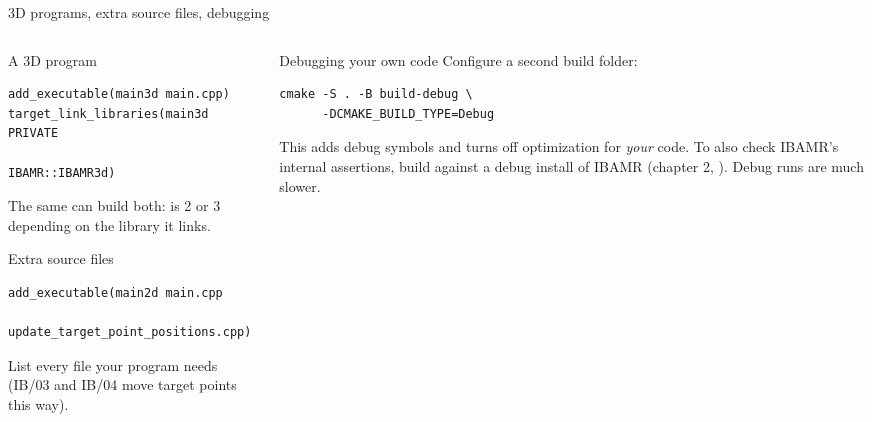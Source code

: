 \documentclass[aspectratio=169,11pt]{beamer}
\begin{document}
\begin{frame}[fragile]{3D programs, extra source files, debugging}
\begin{columns}[T,onlytextwidth]
\begin{column}{0.49\textwidth}
\begin{block}{A 3D program}
\begin{lstlisting}[style=shell]
add_executable(main3d main.cpp)
target_link_libraries(main3d PRIVATE
                      IBAMR::IBAMR3d)
\end{lstlisting}
\small The same  can build both:  is 2 or 3 depending on the library it links.
\end{block}
\begin{block}{Extra source files}
\begin{lstlisting}[style=shell]
add_executable(main2d main.cpp
    update_target_point_positions.cpp)
\end{lstlisting}
\small List every  file your program needs (IB/03 and IB/04 move target points this way).
\end{block}
\end{column}
\begin{column}{0.47\textwidth}
\begin{block}{Debugging your own code}
\small Configure a second build folder:
\begin{lstlisting}[style=shell]
cmake -S . -B build-debug \
      -DCMAKE_BUILD_TYPE=Debug
\end{lstlisting}
\small This adds debug symbols and turns off optimization for \emph{your} code. To also check IBAMR's internal assertions, build against a debug install of IBAMR (chapter 2, ). Debug runs are much slower.
\end{block}
\end{column}
\end{columns}
\end{frame}
\end{document}
